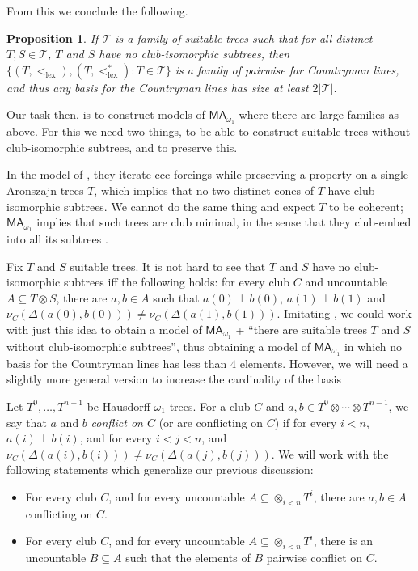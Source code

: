 \documentclass[a4paper,noamsfonts]{amsart}
\newtheorem{proposition}[theorem]{Proposition}
\theoremstyle{definition}
\newcommand{\seb}{\subseteq}
\newcommand{\MA}{\textsf{MA}}
\newcommand{\1}{\mathbbm{1}}
\newcommand{\T}{\mathcal{T}}
\newcommand{\prop}{\Xi}
\newcommand{\propp}{\prop^{+}}
\DeclareMathOperator{\lex}{lex}
\begin{document}
From this we conclude the following.

\begin{proposition}\label{prop:basis}
  If $\T$ is a family of suitable trees such that for all distinct
  $T,S \in \T$, $T$ and $S$ have no club-isomorphic subtrees,
  then $\{(T,<_{\lex}),(T,<_{\lex}^{*}) : T \in \T\}$
  is a family of pairwise far
  Countryman lines, and thus any basis for the Countryman lines
  has size at least $2|\T|$.
\end{proposition}

Our task then, is to construct models of $\MA_{\omega_{1}}$
where there are large families as above. For this we need two things,
to be able to construct suitable trees without club-isomorphic subtrees,
and to preserve this.

In the model of \cite{ShelahAbraham}, they iterate ccc forcings while
preserving a property on a single Aronszajn trees
$T$, which implies that no two
distinct cones of $T$ have club-isomorphic subtrees. We cannot do the
same thing and expect $T$ to be coherent;
$\MA_{\omega_{1}}$ implies that such trees are club minimal,
in the sense that they club-embed into all its subtrees \cite{Todorcevic2007}.

Fix $T$ and $S$ suitable trees. It is not hard to see that $T$ and $S$ have no
club-isomorphic subtrees iff the following holds: for every club $C$
and uncountable $A \seb T \otimes S$, there are $a,b \in A$ such that
$a(0) \perp b(0)$, $a(1) \perp b(1)$ and $\nu_{C}(\Delta(a(0),b(0)))
\neq \nu_{C}(\Delta(a(1),b(1)))$.
Imitating \cite{ShelahAbraham}, we could work with just this idea
to obtain a model of $\MA_{\omega_{1}}$ + ``there are suitable
trees $T$ and $S$ without club-isomorphic subtrees'', thus obtaining
a model of $\MA_{\omega_{1}}$ in which no basis for the Countryman lines
has less than $4$ elements. However, we will need a slightly more general
version to increase the cardinality of the basis

Let $T^{0},\dots,T^{n-1}$ be Hausdorff $\omega_{1}$ trees.
For a club $C$ and $a,b \in T^{0} \otimes \cdots \otimes T^{n-1}$, we say that
$a$ and $b$ \emph{conflict on $C$} (or are conflicting on $C$)
if for every $i < n$, $a(i) \perp b(i)$,
and for every $i < j < n$,
and $\nu_{C}(\Delta(a(i),b(i))) \neq \nu_{C}(\Delta(a(j),b(j)))$.
We will work with the following statements which generalize our previous
discussion:

\begin{itemize}[topsep=1em,align=left]
  \item[$\prop(T^{0},\dots,T^{n-1})$]
  For every club $C$, and
  for every uncountable $A \seb \otimes_{i < n}T^{i}$, there are
  $a,b \in A$ conflicting on $C$.
  \item[$\propp(T^{0},\dots,T^{n-1})$]
  For every club $C$, and
  for every uncountable $A \seb \otimes_{i < n}T^{i}$, there is an
  uncountable $B \seb A$ such that the elements of $B$ pairwise conflict
  on $C$.
\end{itemize}
\end{document}
